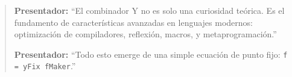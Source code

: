 \documentclass[12pt]{article}
\begin{document}
\begin{quote}
\textbf{Presentador:} ``El combinador Y no es solo una curiosidad teórica. Es el fundamento de características avanzadas en lenguajes modernos: optimización de compiladores, reflexión, macros, y metaprogramación.''

\textbf{Presentador:} ``Todo esto emerge de una simple ecuación de punto fijo: \texttt{f = yFix fMaker}.''
\end{quote}
\end{document}

